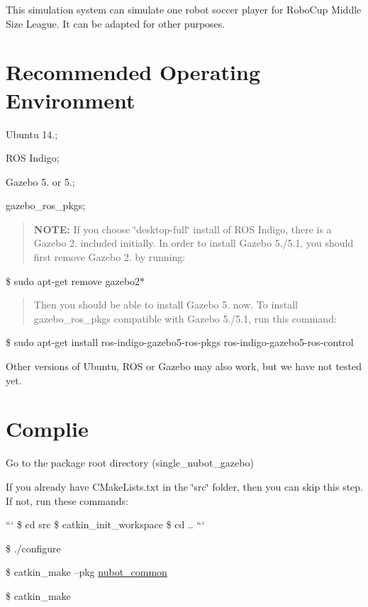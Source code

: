 This simulation system can simulate one robot soccer player for Robo\-Cup Middle Size League. It can be adapted for other purposes.

\section*{Recommended Operating Environment}


\begin{DoxyEnumerate}
\item Ubuntu 14.;
\item R\-O\-S Indigo;
\item Gazebo 5. or 5.;
\item gazebo\-\_\-ros\-\_\-pkgs;
\end{DoxyEnumerate}

\begin{quotation}
{\bfseries N\-O\-T\-E\-:} If you choose \char`\"{}desktop-\/full\char`\"{} install of R\-O\-S Indigo, there is a Gazebo 2. included initially. In order to install Gazebo 5./5.1, you should first remove Gazebo 2. by running\-:

\end{quotation}
{\ttfamily \$ sudo apt-\/get remove gazebo2$\ast$} \begin{quotation}
Then you should be able to install Gazebo 5. now. To install gazebo\-\_\-ros\-\_\-pkgs compatible with Gazebo 5./5.1, run this command\-:

\end{quotation}
{\ttfamily \$ sudo apt-\/get install ros-\/indigo-\/gazebo5-\/ros-\/pkgs ros-\/indigo-\/gazebo5-\/ros-\/control}

Other versions of Ubuntu, R\-O\-S or Gazebo may also work, but we have not tested yet.

\section*{Complie}


\begin{DoxyEnumerate}
\item Go to the package root directory (single\-\_\-nubot\-\_\-gazebo)
\item If you already have C\-Make\-Lists.\-txt in the \char`\"{}src\char`\"{} folder, then you can skip this step. If not, run these commands\-:

``` \$ cd src \$ catkin\-\_\-init\-\_\-workspace \$ cd .. ```
\item \$ ./configure
\item \$ catkin\-\_\-make --pkg \hyperlink{namespacenubot__common}{nubot\-\_\-common}
\item \$ catkin\-\_\-make
\end{DoxyEnumerate}

